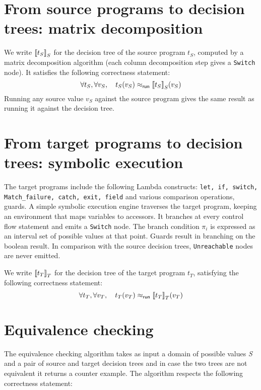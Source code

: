 \documentclass[12pt]{article}
\begin{document}
\section{From source programs to decision trees: matrix decomposition}

We write ${\llbracket{t_S}\rrbracket}_S$ for the decision tree of the source program
$t_S$, computed by a matrix decomposition algorithm (each column
decomposition step gives a \texttt{Switch} node).
It satisfies the following correctness statement:
\[
\forall t_S, \forall v_S, \quad t_S(v_S) \mathrel{\approx_{\mathsf{run}}} {\llbracket{t_S}\rrbracket}_S(v_S)
\]
Running any source value $v_S$ against the source program gives the
same result as running it against the decision tree.



\section{From target programs to decision trees: symbolic execution}
The target programs include the following Lambda constructs:
\texttt{let, if, switch, Match\_failure, catch, exit, field} and
various comparison operations, guards. A simple symbolic execution
engine traverses the target program, keeping an environment that maps
variables to accessors. It branches at every control flow statement
and emits a \texttt{Switch} node. The branch condition $\pi_i$ is
expressed as an interval set of possible values at that point.
%
Guards result in branching on the boolean result.
%
In comparison with the source decision trees, \texttt{Unreachable}
nodes are never emitted.

We write ${\llbracket{t_T}\rrbracket}_T$ for the decision tree of the target program
$t_T$, satisfying the following correctness statement:
\[
\forall t_T, \forall v_T, \quad t_T(v_T) \mathrel{\approx_{\mathsf{run}}} {\llbracket{t_T}\rrbracket}_T(v_T)
\]

\section{Equivalence checking}
The equivalence checking algorithm takes as input a domain of
possible values \emph{S} and a pair of source and target decision trees and
in case the two trees are not equivalent it returns a counter example.
The algorithm respects the following correctness statement:
\end{document}
